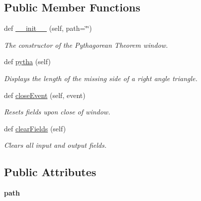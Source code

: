\subsection*{Public Member Functions}
\begin{DoxyCompactItemize}
\item 
def \hyperlink{classpythagore__ui_1_1_pytha_window_a3a9be6ba9c7645923a6e2a9eba16aa23}{\+\_\+\+\_\+init\+\_\+\+\_\+} (self, path=\char`\"{}\char`\"{})
\begin{DoxyCompactList}\small\item\em The constructor of the Pythagorean Theorem window. \end{DoxyCompactList}\item 
def \hyperlink{classpythagore__ui_1_1_pytha_window_accb4cda1de730c8001b0856b8327700a}{pytha} (self)
\begin{DoxyCompactList}\small\item\em Displays the length of the missing side of a right angle triangle. \end{DoxyCompactList}\item 
\mbox{\label{classpythagore__ui_1_1_pytha_window_ac0f093898c8a007de1d1910704d7ba1a}} 
def \hyperlink{classpythagore__ui_1_1_pytha_window_ac0f093898c8a007de1d1910704d7ba1a}{close\+Event} (self, event)
\begin{DoxyCompactList}\small\item\em Resets fields upon close of window. \end{DoxyCompactList}\item 
\mbox{\label{classpythagore__ui_1_1_pytha_window_a5f20fa2c5484ddea1a60c92e422470b9}} 
def \hyperlink{classpythagore__ui_1_1_pytha_window_a5f20fa2c5484ddea1a60c92e422470b9}{clear\+Fields} (self)
\begin{DoxyCompactList}\small\item\em Clears all input and output fields. \end{DoxyCompactList}\end{DoxyCompactItemize}
\subsection*{Public Attributes}
\begin{DoxyCompactItemize}
\item 
\mbox{\label{classpythagore__ui_1_1_pytha_window_a250c9e50d023f6a7344b10e87e57badf}} 
{\bfseries path}
\end{DoxyCompactItemize}


